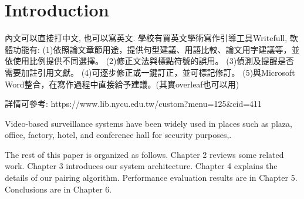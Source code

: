 \chapter{Introduction}
\label{ch:intro}
內文可以直接打中文, 也可以寫英文. 學校有買英文學術寫作引導工具Writefull, 軟體功能有: 
(1)依照論文章節用途，提供句型建議、用語比較、論文用字建議等，並依使用比例提供不同選擇。
(2)修正文法與標點符號的誤用。
(3)偵測及提醒是否需要加註引用文獻。
(4)可逐步修正或一鍵訂正，並可標記修訂。
(5)與Microsoft Word整合，在寫作過程中直接給予建議。(其實overleaf也可以用)

詳情可參考: https://www.lib.nycu.edu.tw/custom?menu=125\&cid=411

Video-based surveillance systems have been widely used in places such as plaza, office, factory, hotel, and conference hall for security purposes\cite{collins2000system},\cite{wang2013intelligent}. 

The rest of this paper is organized as follows. Chapter 2 reviews some related work. Chapter 3 introduces our system architecture. Chapter 4 explains the details of our pairing algorithm. Performance evaluation results are in Chapter 5. Conclusions are in Chapter 6.
